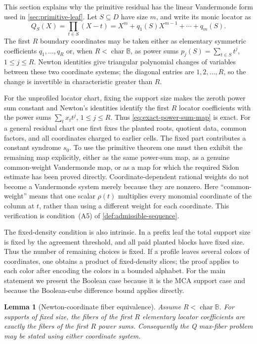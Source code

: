 \documentclass[12pt,a4paper]{amsart}
\numberwithin{equation}{section}
\newtheorem{lemma}[lemma]{Lemma}
\theoremstyle{remark}
\newcommand{\B}{\mathbb B}
\begin{document}
This section explains why the primitive residual has the linear Vandermonde form used in \cref{sec:primitive-leaf}.  Let \(S\subseteq D\) have size \(m\), and write its monic locator as
\[
        Q_S(X)=\prod_{t\in S}(X-t)=X^m+q_1(S)X^{m-1}+\cdots+q_m(S).
\]
The first \(R\) boundary coordinates may be taken either as elementary symmetric coefficients \(q_1,\ldots,q_R\) or, when \(R<\operatorname{char}\B\), as power sums \(p_j(S)=\sum_{t\in S}t^j\), \(1\le j\le R\).  Newton identities give triangular polynomial changes of variables between these two coordinate systems; the diagonal entries are \(1,2,\ldots,R\), so the change is invertible in characteristic greater than \(R\).

For the unprofiled locator chart, fixing the support size makes the zeroth
power sum constant and Newton's identities identify the first \(R\)
locator coefficients with the power sums
\(\sum_tx_tt^j\), \(1\le j\le R\).  Thus
\eqref{eq:exact-power-sum-map} is exact.  For a general residual chart one
first fixes the planted roots, quotient data, common factors, and all
coordinates charged to earlier cells.  The fixed part contributes a
constant syndrome \(s_0\).  To use the primitive theorem one must then
exhibit the remaining map explicitly, either as the same power-sum map, as
a genuine common-weight Vandermonde map, or as a map for which the required
Sidon estimate has been proved directly.  Coordinate-dependent rational
weights do not become a Vandermonde system merely because they are
nonzero.  Here ``common-weight'' means that one scalar \(\rho(t)\)
multiplies every monomial coordinate of the column at \(t\), rather than
using a different weight for each coordinate.  This verification is condition~\textup{(A5)} of
\cref{def:admissible-sequence}.

The fixed-density condition is also intrinsic.  In a prefix leaf the total
support size is fixed by the agreement threshold, and all paid planted
blocks have fixed size.  Thus the number of remaining choices is fixed.  If
a profile leaves several colors of coordinates, one obtains a product of
fixed-density slices; the proof applies to each color after encoding the
colors in a bounded alphabet.  For the main statement we present the
Boolean case because it is the MCA support case and because the
Boolean-cube difference bound applies directly.

\begin{lemma}[Newton-coordinate fiber equivalence]\label{lem:newton-equivalence}
Assume \(R<\operatorname{char}\B\).  For supports of fixed size, the fibers of the first \(R\) elementary locator coefficients are exactly the fibers of the first \(R\) power sums.  Consequently the Q max-fiber problem may be stated using either coordinate system.
\end{lemma}
\end{document}
